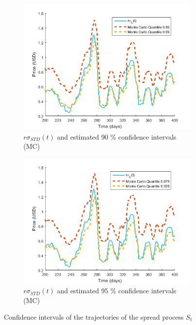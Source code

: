 \documentclass[11pt,a4,twosided,singlespacing,titlepagenumber=on]{scrreprt}
\numberwithin{equation}{chapter} %
\theoremstyle{remark}
\begin{document}
\begin{figure}[H]
    \begin{subfigure}[t]{0.49\textwidth}
        \centering
        \includegraphics[width=1\textwidth]{model_vol/4}
        \caption{$r\sigma_{STD}(t)$ and estimated 90 \% confidence intervals (MC)}
        \label{vol_mod_4}
    \end{subfigure}
    \begin{subfigure}[t]{0.49\textwidth}
        \centering
        \includegraphics[width=1\textwidth]{model_vol/4_2}
        \caption{$r\sigma_{STD}(t)$ and estimated 95 \% confidence intervals (MC)}
        \label{vol_mod_4}
    \end{subfigure}
    \caption{Confidence intervals of the trajectories of the spread process $S_t$}
    \label{fig:rolling_vol_and_confidence_intervals}
\end{figure}
\end{document}
